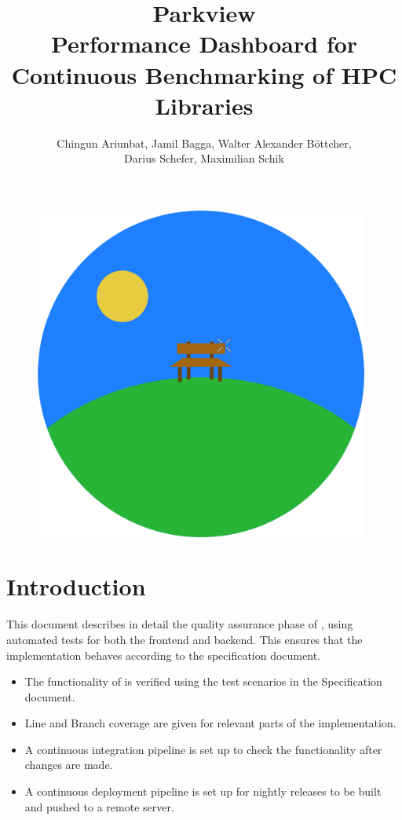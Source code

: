 \documentclass[parskip=full,11pt]{scrartcl}
\title{\Huge Parkview\\
    \LARGE \normalfont Performance Dashboard for Continuous Benchmarking of HPC Libraries}
\author{Chingun Ariunbat, Jamil Bagga, Walter Alexander B\"ottcher,\\Darius Schefer, Maximilian Schik}
\begin{document}
\maketitle
\begin{figure}[h]
	\includegraphics[width=11cm]{parkview.png}
	\centering
\end{figure}

\thispagestyle{empty}

\clearpage
{}

\tableofcontents
\clearpage

\section{Introduction}
This document describes in detail the quality assurance phase of \parkview{}, using automated tests for both the frontend and backend. This ensures that the implementation behaves according to the specification document.
\begin{itemize}
  \item The functionality of \parkview{} is verified using the test scenarios in the Specification document.
  \item Line and Branch coverage are given for relevant parts of the implementation.
  \item A continuous integration pipeline is set up to check the functionality after changes are made.
  \item A continuous deployment pipeline is set up for nightly releases to be built and pushed to a remote server.
\end{itemize}
\clearpage


\clearpage


\clearpage


\clearpage


\clearpage


\appendix

\end{document}
